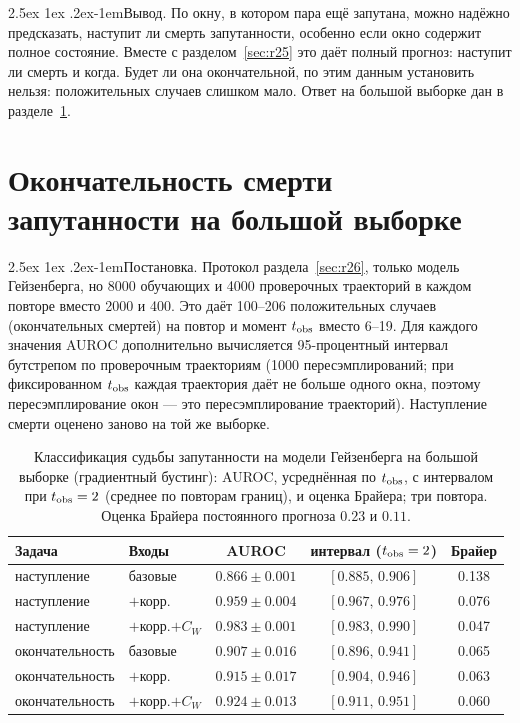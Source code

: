 \documentclass[12pt,a4paper]{report}
\makeatletter
\renewcommand\paragraph{\@startsection{paragraph}{4}{\z@}%
  {2.5ex \@plus1ex \@minus.2ex}{-1em}{\normalfont\normalsize\bfseries}}
\numberwithin{equation}{chapter}
\makeatother
\begin{document}
\paragraph{Вывод.} По окну, в котором пара ещё запутана, можно надёжно
предсказать, наступит ли смерть запутанности, особенно если окно содержит
полное состояние. Вместе с разделом~\ref{sec:r25} это даёт полный прогноз:
наступит ли смерть и когда. Будет ли она окончательной, по этим
данным установить нельзя: положительных случаев слишком мало. Ответ на
большой выборке дан в разделе~\ref{sec:r27}.

\section{Окончательность смерти запутанности на большой выборке}
\label{sec:r27}

\paragraph{Постановка.} Протокол раздела~\ref{sec:r26}, только модель
Гейзенберга, но 8000 обучающих и 4000 проверочных траекторий в каждом
повторе вместо 2000 и 400. Это даёт 100--206 положительных случаев
(окончательных смертей) на повтор и момент $t_{\rm obs}$ вместо 6--19. Для
каждого значения AUROC дополнительно вычисляется 95-процентный интервал
бутстрепом по проверочным траекториям (1000 пересэмплирований; при
фиксированном $t_{\rm obs}$ каждая траектория даёт не больше одного окна,
поэтому пересэмплирование окон --- это пересэмплирование траекторий).
Наступление смерти оценено заново на той же выборке.

\begin{table}[h]
\centering
\caption{Классификация судьбы запутанности на модели Гейзенберга на
большой выборке (градиентный бустинг): AUROC, усреднённая по $t_{\rm obs}$,
с интервалом при $t_{\rm obs}=2$ (среднее по повторам границ), и оценка
Брайера; три повтора. Оценка Брайера постоянного прогноза $0.23$ и $0.11$.}
\label{tab:r27}
\small
\begin{tabular}{@{}llccc@{}}
\toprule
Задача & Входы & AUROC & интервал ($t_{\rm obs}=2$) & Брайер \\
\midrule
наступление & базовые & $0.866\pm0.001$ & $[0.885,\,0.906]$ & 0.138 \\
наступление & $+$корр. & $0.959\pm0.004$ & $[0.967,\,0.976]$ & 0.076 \\
наступление & $+$корр.$+C_W$ & $\mathbf{0.983\pm0.001}$ & $[0.983,\,0.990]$ & 0.047 \\
\midrule
окончательность & базовые & $0.907\pm0.016$ & $[0.896,\,0.941]$ & 0.065 \\
окончательность & $+$корр. & $0.915\pm0.017$ & $[0.904,\,0.946]$ & 0.063 \\
окончательность & $+$корр.$+C_W$ & $\mathbf{0.924\pm0.013}$ & $[0.911,\,0.951]$ & 0.060 \\
\bottomrule
\end{tabular}
\end{table}
\end{document}
